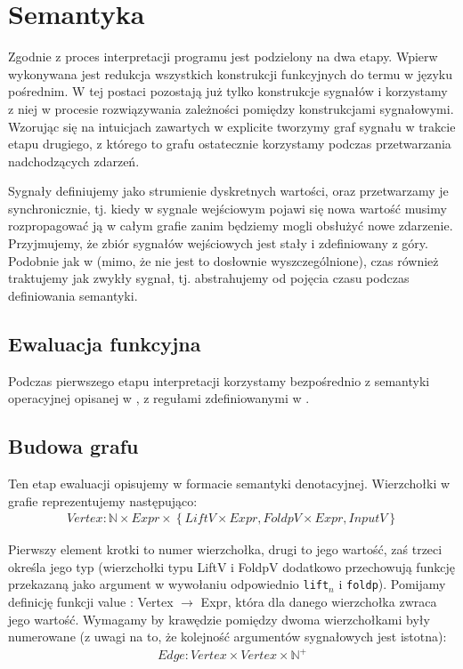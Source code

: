 \documentclass[11pt,leqno]{article}
\begin{document}
\section{Semantyka}

Zgodnie z \cite[p.~3.3]{CC} proces interpretacji programu jest podzielony na dwa etapy. Wpierw wykonywana jest redukcja wszystkich konstrukcji funkcyjnych do termu w języku pośrednim. W tej postaci  pozostają już tylko konstrukcje sygnałów i korzystamy z niej w procesie rozwiązywania zależności pomiędzy konstrukcjami sygnałowymi. Wzorując się na intuicjach zawartych w \cite[p.~3.3.2]{CC} explicite tworzymy graf sygnału w trakcie etapu drugiego, z którego to grafu ostatecznie korzystamy podczas przetwarzania nadchodzących zdarzeń.


Sygnały definiujemy jako strumienie dyskretnych wartości, oraz przetwarzamy je synchronicznie, tj. kiedy w sygnale wejściowym pojawi się nowa wartość musimy rozpropagować ją w całym grafie zanim będziemy mogli obsłużyć nowe zdarzenie. Przyjmujemy, że zbiór sygnałów wejściowych jest stały i zdefiniowany z góry. Podobnie jak w \nocite{CC} (mimo, że nie jest to dosłownie wyszczególnione), czas również traktujemy jak zwykły sygnał, tj. abstrahujemy od pojęcia czasu podczas definiowania semantyki.

\subsection{Ewaluacja funkcyjna}

Podczas pierwszego etapu interpretacji korzystamy bezpośrednio z semantyki operacyjnej opisanej w \cite[p.~3.3.1]{CC}, z regułami zdefiniowanymi w \cite[fig.~6]{CC}. 

\subsection{Budowa grafu}
Ten etap ewaluacji opisujemy w formacie semantyki denotacyjnej. Wierzchołki w grafie reprezentujemy następująco:
\begin{gather*}
Vertex : \mathbb N \times Expr \times \left\{ {LiftV \times Expr, FoldpV \times Expr, InputV}\right\} 
\end{gather*}

Pierwszy element krotki to numer wierzchołka, drugi to jego wartość, zaś trzeci określa jego typ (wierzchołki typu LiftV i FoldpV dodatkowo przechowują funkcję przekazaną jako argument w wywołaniu odpowiednio \texttt{lift$_{n}$} i \texttt{foldp}). Pomijamy definicję funkcji value : Vertex $\rightarrow$ Expr, która dla danego wierzchołka zwraca jego wartość. Wymagamy by krawędzie pomiędzy dwoma wierzchołkami były numerowane (z uwagi na to, że kolejność argumentów sygnałowych jest istotna):
\begin{gather*}
Edge : Vertex \times Vertex \times \mathbb N^+
\end{gather*}
\end{document}
